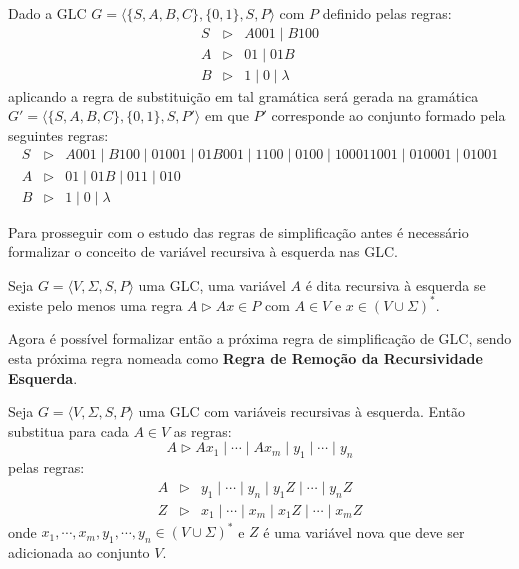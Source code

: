 \begin{example}
    Dado a GLC $G = \langle \{S, A, B, C\}, \{0,1\}, S, P \rangle$ com $P$ definido pelas regras:
    \begin{eqnarray*}
        S & \rhd & A001 \mid B100\\
        A & \rhd & 01 \mid 01B\\
        B & \rhd & 1 \mid 0 \mid \lambda
    \end{eqnarray*}
    aplicando a regra de substituição em tal gramática será gerada na gramática $G' = \langle \{S, A, B, C\}, \{0,1\}, S, P' \rangle$ em que $P'$ corresponde ao conjunto formado pela seguintes regras:
    \begin{eqnarray*}
        S & \rhd & A001 \mid B100 \mid  01001 \mid 01B001 \mid 1100 \mid 0100 \mid 100 011001 \mid 010001 \mid 01001\\
        A & \rhd & 01 \mid 01B \mid 011 \mid  010 \\
        B & \rhd & 1 \mid 0 \mid \lambda
    \end{eqnarray*}
\end{example}

Para prosseguir com o estudo das regras de simplificação antes é necessário formalizar o conceito de variável recursiva à esquerda nas GLC.

\begin{definition}\label{def:VariavelRecursiva}
    Seja $G = \langle V, \Sigma, S, P\rangle$ uma GLC, uma variável $A$ é dita recursiva à esquerda se existe pelo menos uma regra $A \rhd Ax \in P$ com  $A \in V$ e $x \in (V \cup \Sigma)^*$.
\end{definition}

Agora é possível formalizar então a próxima regra de simplificação de GLC, sendo esta próxima regra nomeada como \textbf{Regra de Remoção da Recursividade Esquerda}.

\begin{definition}\label{def:RegraRecursiva}
    Seja $G = \langle V, \Sigma, S, P\rangle$ uma GLC com variáveis recursivas à esquerda. Então substitua para cada $A \in V$ as regras:
    $$A \rhd Ax_1 \mid \cdots \mid Ax_m \mid y_1 \mid \cdots \mid y_n$$
    pelas regras:
    \begin{eqnarray*}
        A & \rhd & y_1 \mid \cdots \mid y_n \mid y_1Z \mid \cdots \mid y_nZ\\
        Z & \rhd & x_1 \mid \cdots \mid x_m \mid x_1Z \mid \cdots \mid x_mZ
    \end{eqnarray*}
	onde $x_1, \cdots, x_m, y_1, \cdots, y_n \in (V \cup \Sigma)^*$ e $Z$ é uma variável nova que deve ser adicionada ao conjunto $V$.
\end{definition}

